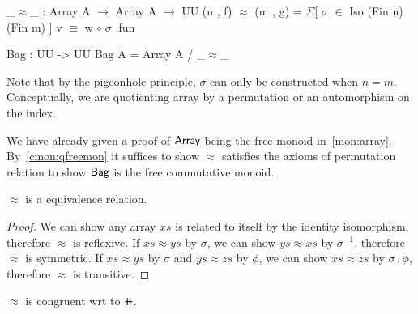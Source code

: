 \begin{code}
_$\approx$_ : Array A $\to$ Array A $\to$ UU
(n , f) $\approx$ (m , g) = $\Sigma$[ $\sigma$ $\in$ Iso (Fin n) (Fin m) ] v $\equiv$ w $\circ$ $\sigma$ .fun

Bag : UU -> UU
Bag A = Array A / _$\approx$_
\end{code}

Note that by the pigeonhole principle, $\sigma$ can only be constructed when $n = m$. Conceptually,
we are quotienting array by a permutation or an automorphism on the index.

We have already given a proof of $\operatorname{\mathsf{Array}}$ being the free monoid in~\ref{mon:array}.
By~\ref{cmon:qfreemon} it suffices to show $\approx$ satisfies the axioms of permutation relation
to show $\operatorname{\mathsf{Bag}}$ is the free commutative monoid.

\begin{proposition}
    $\approx$ is a equivalence relation.
\end{proposition}

\begin{proof}
    We can show any array $xs$ is related to itself by the identity isomorphism, therefore $\approx$ is reflexive.
    If $xs \approx ys$ by $\sigma$, we can show $ys \approx xs$ by $\sigma^{-1}$, therefore $\approx$ is symmetric.
    If $xs \approx ys$ by $\sigma$ and $ys \approx zs$ by $\phi$, we can show $xs \approx zs$ by $\sigma \comp \phi$,
    therefore $\approx$ is transitive.
\end{proof}

\begin{proposition}\label{bag:cong}
    $\approx$ is congruent wrt to $\doubleplus$.
\end{proposition}

